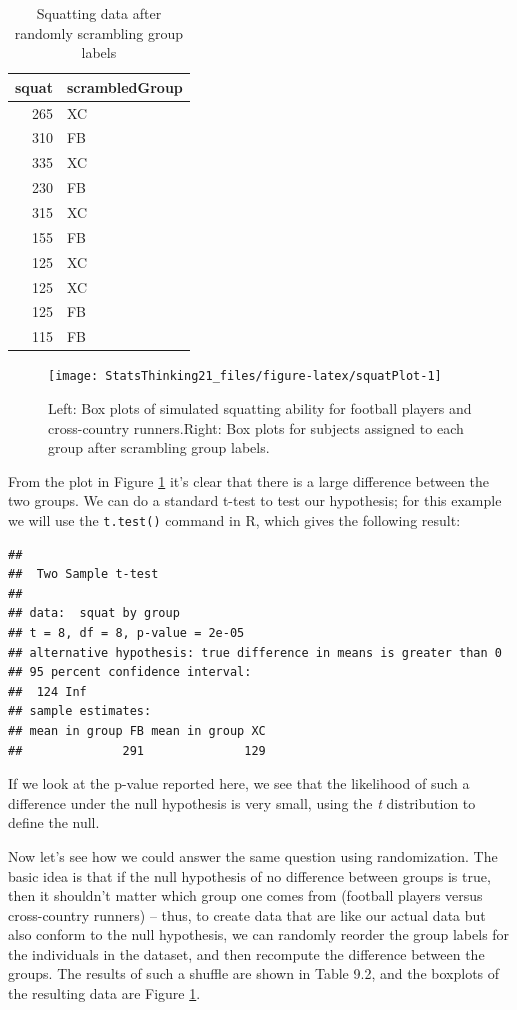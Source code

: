 \documentclass[12pt,]{book}
\theoremstyle{definition}
\theoremstyle{definition}
\theoremstyle{definition}
\theoremstyle{remark}
\begin{document}
\begin{table}

\caption{\label{tab:squatPlot}Squatting data after randomly scrambling group labels}
\centering
\begin{tabular}[t]{r|l}
\hline
squat & scrambledGroup\\
\hline
265 & XC\\
\hline
310 & FB\\
\hline
335 & XC\\
\hline
230 & FB\\
\hline
315 & XC\\
\hline
155 & FB\\
\hline
125 & XC\\
\hline
125 & XC\\
\hline
125 & FB\\
\hline
115 & FB\\
\hline
\end{tabular}
\end{table}

\begin{figure}
\texttt{[image: StatsThinking21\_files/figure-latex/squatPlot-1]} \caption{Left: Box plots of simulated squatting ability for football players and cross-country runners.Right: Box plots for subjects assigned to each group after scrambling group labels.}\label{fig:squatPlot}
\end{figure}

From the plot in Figure \ref{fig:squatPlot} it's clear that there is a large difference between the two groups. We can do a standard t-test to test our hypothesis; for this example we will use the \texttt{t.test()} command in R, which gives the following result:

\begin{verbatim}
## 
##  Two Sample t-test
## 
## data:  squat by group
## t = 8, df = 8, p-value = 2e-05
## alternative hypothesis: true difference in means is greater than 0
## 95 percent confidence interval:
##  124 Inf
## sample estimates:
## mean in group FB mean in group XC 
##              291              129
\end{verbatim}

If we look at the p-value reported here, we see that the likelihood of such a difference under the null hypothesis is very small, using the \emph{t} distribution to define the null.

Now let's see how we could answer the same question using randomization. The basic idea is that if the null hypothesis of no difference between groups is true, then it shouldn't matter which group one comes from (football players versus cross-country runners) -- thus, to create data that are like our actual data but also conform to the null hypothesis, we can randomly reorder the group labels for the individuals in the dataset, and then recompute the difference between the groups. The results of such a shuffle are shown in Table 9.2, and the boxplots of the resulting data are Figure \ref{fig:squatPlot}.
\end{document}
